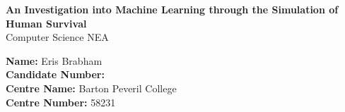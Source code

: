 \documentclass{article}
\begin{document}
\begin{titlepage}
    \begin{center}
        \vspace*{3cm}
        {\Huge \textbf{An Investigation into Machine Learning through the Simulation of Human Survival}} \\
        \vspace{1cm}
        {\Large Computer Science NEA}
        
        \vfill
        
        \large
        \textbf{Name:} Eris Brabham \\
        \textbf{Candidate Number:} \\
        \vspace{0.2cm}
        \textbf{Centre Name:} Barton Peveril College\\
        \textbf{Centre Number:} 58231\\
        \pagebreak
    \end{center}
\end{titlepage}

\large

\setcounter{tocdepth}{5}
\tableofcontents










\end{document}
